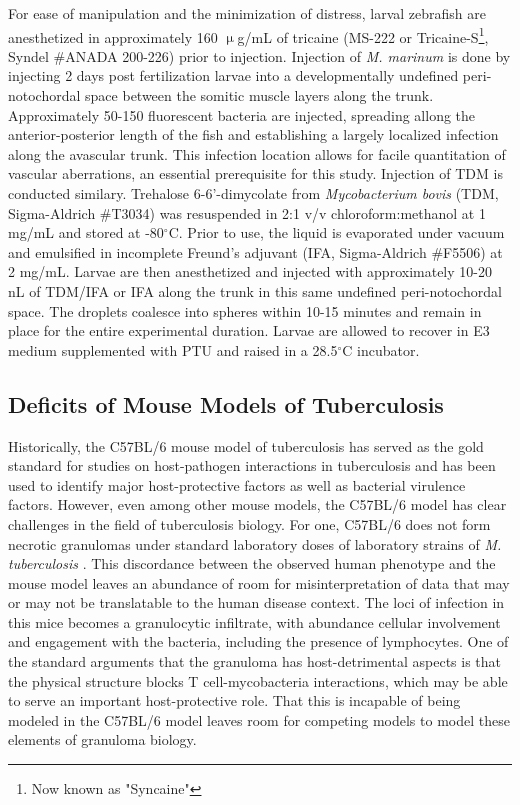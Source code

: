For ease of manipulation and the minimization of distress, larval zebrafish are anesthetized in approximately 160 $\upmu$g/mL of tricaine (MS-222 or Tricaine-S\footnote{Now known as "Syncaine"}, Syndel \#ANADA 200-226) prior to injection. Injection of \textit{M. marinum} is done by injecting 2 days post fertilization larvae into a developmentally undefined peri-notochordal space between the somitic muscle layers along the trunk. Approximately 50-150 fluorescent bacteria are injected, spreading allong the anterior-posterior length of the fish and establishing a largely localized infection along the avascular trunk. This infection location allows for facile quantitation of vascular aberrations, an essential prerequisite for this study. Injection of TDM is conducted similary. Trehalose 6-6'-dimycolate from \textit{Mycobacterium bovis} (TDM, Sigma-Aldrich \#T3034) was resuspended in 2:1 v/v chloroform:methanol at 1 mg/mL and stored at -80$^{\circ}$C. Prior to use, the liquid is evaporated under vacuum and emulsified in incomplete Freund's adjuvant (IFA, Sigma-Aldrich \#F5506) at 2 mg/mL. Larvae are then anesthetized and injected with approximately 10-20 nL of TDM/IFA or IFA along the trunk in this same undefined peri-notochordal space. The droplets coalesce into spheres within 10-15 minutes and remain in place for the entire experimental duration. Larvae are allowed to recover in E3 medium supplemented with PTU and raised in a 28.5$^{\circ}$C incubator.

\subsection{Deficits of Mouse Models of Tuberculosis}

Historically, the C57BL/6 mouse model of tuberculosis has served as the gold standard for studies on host-pathogen interactions in tuberculosis and has been used to identify major host-protective factors as well as bacterial virulence factors. However, even among other mouse models, the C57BL/6 model has clear challenges in the field of tuberculosis biology. For one, C57BL/6 does not form necrotic granulomas under standard laboratory doses of laboratory strains of \textit{M. tuberculosis} \citep{Orme1998}. This discordance between the observed human phenotype and the mouse model leaves an abundance of room for misinterpretation of data that may or may not be translatable to the human disease context. The loci of infection in this mice becomes a granulocytic infiltrate, with abundance cellular involvement and engagement with the bacteria, including the presence of lymphocytes. One of the standard arguments that the granuloma has host-detrimental aspects is that the physical structure blocks T cell-mycobacteria interactions, which may be able to serve an important host-protective role. That this is incapable of being modeled in the C57BL/6 model leaves room for competing models to model these elements of granuloma biology.

